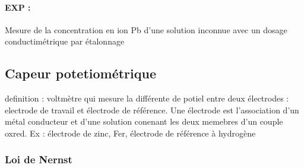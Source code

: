\paragraph{EXP :} Mesure de la concentration en ion Pb d'une solution inconnue avec un dosage conductimétrique par étalonnage

\subsection{Capeur potetiométrique}

definition : voltmètre qui mesure la différente de potiel entre deux électrodes : electrode de travail et électrode de référence.
Une électrode est l'association d'un métal conducteur et d'une solution conenant les deux memebres d'un couple oxred.
Ex : électrode de zinc, Fer, électrode de référence à hydrogène

\subsubsection{Loi de Nernst}